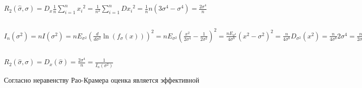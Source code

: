 \documentclass[12pt, a4paper]{article}
\begin{document}
$R_2(\hat{\sigma}, \sigma) =
D_x \frac{1}{n} \sum\limits_{i = 1}^n {x_i}^2 =
\frac{1}{n^2} \sum\limits_{i = 1}^n D {x_i}^2 = 
\frac{1}{n} n (3\sigma^4 - \sigma^4) = \frac{2\sigma^4}{n}$

\subsection{}

$I_n(\sigma^2) = n I(\sigma^2) =
nE_{\sigma^2} (\frac{d}{d\sigma^2} \ln(f_\sigma(x)))^2 = 
nE_{\sigma^2} (\frac{x^2}{2\sigma^4} - \frac{1}{2\sigma^2})^2 = 
\frac{nE_{\sigma^2}}{4\sigma^8} (x^2 - \sigma^2)^2 =
\frac{n}{4\sigma^8} D_{\sigma^2}(x^2) = 
\frac{n}{4\sigma^8} 2\sigma^4 = \frac{n}{2\sigma^4}$

\subsection{}

$R_2(\hat{\sigma}, \sigma) =
D_x(\hat{\sigma}) = 
\frac{2\sigma^4}{n} = \frac{1}{I_n(\sigma^2)}$

Согласно неравенству Рао-Крамера оценка является эффективной
\end{document}
